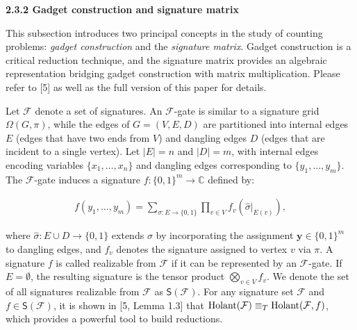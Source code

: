 \documentclass[10pt,a4paper]{article}
\begin{document}




\par\medskip\noindent\textbf{
2.3.2 Gadget construction and signature matrix}\par




This subsection introduces two principal concepts in the study of counting problems: \emph{gadget construction} and the \emph{signature matrix}. Gadget construction is a critical reduction technique, and the signature matrix provides an algebraic representation bridging gadget construction with matrix multiplication. Please refer to [5] as well as the full version of this paper for details.\par




Let $\mathcal{F}$ denote a set of signatures. An $\mathcal{F}$-gate is similar to a signature grid $\Omega(G,\pi)$, while the edges of $G=(V,E,D)$ are partitioned into internal edges $E$ (edges that have two ends from $V$) and dangling edges $D$ (edges that are incident to a single vertex). Let $|E|=n$ and $|D|=m$, with internal edges encoding variables $\{x_{1},\ldots,x_{n}\}$ and dangling edges corresponding to $\{y_{1},\ldots,y_{m}\}$. The $\mathcal{F}$-gate induces a signature $f:\{0,1\}^{m}\to\mathbb{C}$ defined by:\par


\[\begin{gathered}
f(y_{1},\ldots,y_{m})=\sum_{\sigma:E\to\{0,1\}}\prod_{v\in V}f_{v}\left(\hat{\sigma}|_{E(v)}\right),
\end{gathered}\]


where $\hat{\sigma}:E\cup D\to\{0,1\}$ extends $\sigma$ by incorporating the assignment $\mathbf{y}\in\{0,1\}^{m}$ to dangling edges, and $f_{v}$ denotes the signature assigned to vertex $v$ via $\pi$. A signature $f$ is called realizable from $\mathcal{F}$ if it can be represented by an $\mathcal{F}$-gate. If $E=\emptyset$, the resulting signature is the tensor product $\bigotimes_{v\in V}f_{v}$. We denote the set of all signatures realizable from $\mathcal{F}$ as $\textsf{S}(\mathcal{F})$.
For any signature set $\mathcal{F}$ and $f\in\textsf{S}(\mathcal{F})$, it is shown in [5, Lemma 1.3] that $\textup{{Holant}}(\mathcal{F})\equiv_{T}\textup{{Holant}}(\mathcal{F},f)$, which provides a powerful tool to build reductions.\par
\end{document}
